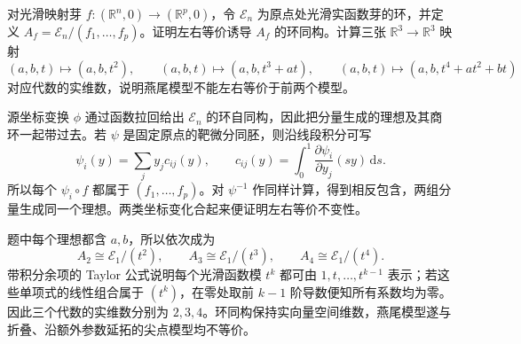 \begin{exercise}\label{g2:ex:swallowtail-distinction}
	对光滑映射芽 \(f:(\mathbb R^n,0)\to(\mathbb R^p,0)\)，令 \(\mathcal E_n\) 为原点处光滑实函数芽的环，并定义 \(A_f=\mathcal E_n/(f_1,\ldots,f_p)\)。证明左右等价诱导 \(A_f\) 的环同构。计算三张 \(\mathbb R^3\to\mathbb R^3\) 映射
	\[
		(a,b,t)\mapsto(a,b,t^2),\qquad
		(a,b,t)\mapsto(a,b,t^3+at),\qquad
		(a,b,t)\mapsto(a,b,t^4+at^2+bt)
	\]
	对应代数的实维数，说明燕尾模型不能左右等价于前两个模型。
\end{exercise}
\begin{solution}
	源坐标变换 \(\phi\) 通过函数拉回给出 \(\mathcal E_n\) 的环自同构，因此把分量生成的理想及其商环一起带过去。若 \(\psi\) 是固定原点的靶微分同胚，则沿线段积分可写
	\[
		\psi_i(y)=\sum_j y_j c_{ij}(y),\qquad
		c_{ij}(y)=\int_0^1\frac{\partial\psi_i}{\partial y_j}(sy)\,\mathrm ds.
	\]
	所以每个 \(\psi_i\circ f\) 都属于 \((f_1,\ldots,f_p)\)。对 \(\psi^{-1}\) 作同样计算，得到相反包含，两组分量生成同一个理想。两类坐标变化合起来便证明左右等价不变性。

	题中每个理想都含 \(a,b\)，所以依次成为
	\[
		A_2\cong\mathcal E_1/(t^2),\qquad
		A_3\cong\mathcal E_1/(t^3),\qquad
		A_4\cong\mathcal E_1/(t^4).
	\]
	带积分余项的 Taylor 公式说明每个光滑函数模 \(t^k\) 都可由 \(1,t,\ldots,t^{k-1}\) 表示；若这些单项式的线性组合属于 \((t^k)\)，在零处取前 \(k-1\) 阶导数便知所有系数均为零。因此三个代数的实维数分别为 \(2,3,4\)。环同构保持实向量空间维数，燕尾模型遂与折叠、沿额外参数延拓的尖点模型均不等价。
\end{solution}
